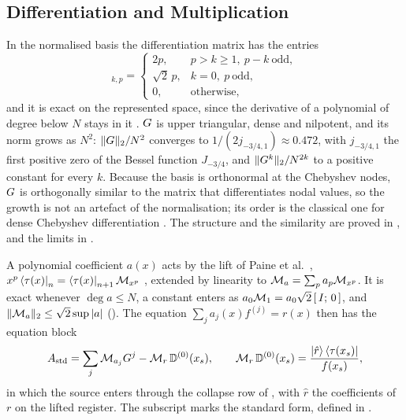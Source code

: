 \subsection{Differentiation and Multiplication}
\label{sec:standard-operators}

In the normalised basis the differentiation matrix has the entries
\begin{equation}
    [\G]_{k,p} =
    \begin{cases}
        2p, & p > k \ge 1,\ p-k\ \text{odd}, \\
        \sqrt{2}\,p, & k = 0,\ p\ \text{odd}, \\
        0, & \text{otherwise},
    \end{cases}
    \label{eq:pihm-G-entries}
\end{equation}
and it is exact on the represented space, since the derivative of a polynomial of degree below $N$ stays in it \cite{olver2013}. $G$ is upper triangular, dense and nilpotent, and its norm grows as $N^2$: $\|G\|_2/N^2$ converges to $1/(2j_{-3/4,1})\approx0.472$, with $j_{-3/4,1}$ the first positive zero of the Bessel function $J_{-3/4}$, and $\|G^k\|_2/N^{2k}$ to a positive constant for every $k$. Because the basis is orthonormal at the Chebyshev nodes, $G$ is orthogonally similar to the matrix that differentiates nodal values, so the growth is not an artefact of the normalisation; its order is the classical one for dense Chebyshev differentiation \cite{olver2013,canuto2006spectral}. The structure and the similarity are proved in , and the limits in .

A polynomial coefficient $a(x)$ acts by the lift of Paine et al.\ \cite{paine2023physicsinformed}, $x^p\bra{\tau(x)}_n=\bra{\tau(x)}_{n+1}\mathcal{M}_{x^p}$ \cite{wu2025pihm}, extended by linearity to $\mathcal{M}_a=\sum_pa_p\mathcal{M}_{x^p}$. It is exact whenever $\deg a\le N$, a constant enters as $a_0\mathcal{M}_1=a_0\sqrt2\,[\,I;\,0\,]$, and $\|\mathcal{M}_a\|_2\le\sqrt2\sup|a|$ (). The equation $\sum_ja_j(x)f^{(j)}=r(x)$ then has the equation block
\begin{equation}
    A_{\mathrm{std}}=\sum_{j}\mathcal{M}_{a_j}G^{j}-\mathcal{M}_r\,\mathbb{D}^{(0)}(x_s), \qquad \mathcal{M}_r\,\mathbb{D}^{(0)}(x_s)=\frac{\ket{\hat r}\bra{\tau(x_s)}}{f(x_s)},
    \label{eq:standard-equation}
\end{equation}
in which the source enters through the collapse row of , with $\hat r$ the coefficients of $r$ on the lifted register. The subscript marks the standard form, defined in .

